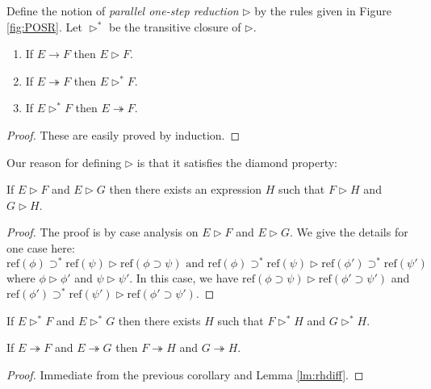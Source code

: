 \documentclass[a4paper,UKenglish]{lipics-v2016}
\newcommand*{\reff}[1]{\ensuremath{\mathrm{ref} \left( {#1} \right)}}
\theoremstyle{plain}
\theoremstyle{definition}
\begin{document}
\begin{definition}
Define the notion of \emph{parallel one-step reduction} $\rhd$ by the rules given in Figure \ref{fig:POSR}.
Let $\rhd^*$ be the transitive closure of $\rhd$.
\end{definition}

\begin{lemma}
\label{lm:rhdiff}
\begin{enumerate}
\item
If $E \rightarrow F$ then $E \rhd F$.
\item
If $E \twoheadrightarrow F$ then $E \rhd^* F$.
\item
If $E \rhd^* F$ then $E \twoheadrightarrow F$.
\end{enumerate}
\end{lemma}

\begin{proof}
These are easily proved by induction.
\end{proof}

Our reason for defining $\rhd$ is that it satisfies the diamond property:

\begin{lemma}
If $E \rhd F$ and $E \rhd G$ then there exists an expression $H$ such that $F \rhd H$ and $G \rhd H$.
\end{lemma}

\begin{proof}
The proof is by case analysis on $E \rhd F$ and $E \rhd G$.  We give the details for one case here:
$$ \reff{\phi} \supset^* \reff{\psi} \rhd \reff{\phi \supset \psi} \mbox{ and } \reff{\phi} \supset^* \reff{\psi} \rhd \reff{\phi'} \supset^* \reff{\psi'} $$
where $\phi \rhd \phi'$ and $\psi \rhd \psi'$.  In this case, we have $\reff{\phi \supset \psi} \rhd \reff{\phi' \supset \psi'}$ and $\reff{\phi'} \supset^* \reff{\psi'}
\rhd \reff{\phi' \supset \psi'}$.
\end{proof}

\begin{corollary}
If $E \rhd^* F$ and $E \rhd^* G$ then there exists $H$ such that $F \rhd^* H$ and $G \rhd^* H$.
\end{corollary}

\begin{corollary}
If $E \twoheadrightarrow F$ and $E \twoheadrightarrow G$ then $F \twoheadrightarrow H$ and $G \twoheadrightarrow H$.
\end{corollary}

\begin{proof}
Immediate from the previous corollary and Lemma \ref{lm:rhdiff}.
\end{proof}
\end{document}

